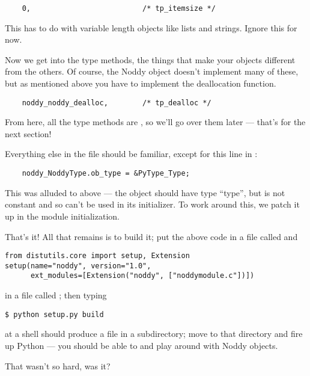 \begin{verbatim}
    0,                          /* tp_itemsize */
\end{verbatim}

This has to do with variable length objects like lists and strings.
Ignore this for now.

Now we get into the type methods, the things that make your objects
different from the others.  Of course, the Noddy object doesn't
implement many of these, but as mentioned above you have to implement
the deallocation function.

\begin{verbatim}
    noddy_noddy_dealloc,        /* tp_dealloc */
\end{verbatim}

From here, all the type methods are \NULL, so we'll go over them later
--- that's for the next section!

Everything else in the file should be familiar, except for this line
in :

\begin{verbatim}
    noddy_NoddyType.ob_type = &PyType_Type;
\end{verbatim}

This was alluded to above --- the  object should
have type ``type'', but  is not constant and so
can't be used in its initializer.  To work around this, we patch it up
in the module initialization.

That's it!  All that remains is to build it; put the above code in a
file called  and

\begin{verbatim}
from distutils.core import setup, Extension
setup(name="noddy", version="1.0",
      ext_modules=[Extension("noddy", ["noddymodule.c"])])
\end{verbatim}

in a file called ; then typing

\begin{verbatim}
$ python setup.py build
\end{verbatim} %

at a shell should produce a file  in a subdirectory;
move to that directory and fire up Python --- you should be able to
 and play around with Noddy objects.

That wasn't so hard, was it?


